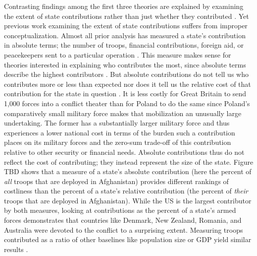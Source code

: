 \documentclass[12pt,letterpaper]{article}
\begin{document}
		Contrasting findings among the first three theories are explained by examining the extent of state contributions rather than just whether they contributed \citep[4]{cranmer_coalitionqualitymultinational_2017}. Yet previous work examining the extent of state contributions suffers from improper conceptualization. Almost all prior analysis has measured a state's contribution in absolute terms; the number of troops, financial contributions, foreign aid, or peacekeepers sent to a particular operation \citep{mello_democraticparticipationarmed_2014, haesebrouck_explainingmemberstates_2016}. This measure makes sense for theories interested in explaining who contributes the most, since absolute terms describe the highest contributors \citep[40-41]{bogers_missionafghanistanwho_2013}. But absolute contributions do not tell us who contributes more or less than expected nor does it tell us the relative cost of that contribution for the state in question \citep{kreps_eliteconsensusdeterminant_2010}. It is less costly for Great Britain to send 1,000 forces into a conflict theater than for Poland to do the same since Poland's comparatively small military force makes that mobilization an unusually large undertaking. The former has a substantially larger military force and thus experiences a lower national cost in terms of the burden such a contribution places on its military forces and the zero-sum trade-off of this contribution relative to other security or financial needs. Absolute contributions thus do not reflect the cost of contributing; they instead represent the size of the state. Figure TBD shows that a measure of a state's absolute contribution (here the percent of \emph{all} troops that are deployed in Afghanistan) provides different rankings of costliness than the percent of a state's relative contribution (the percent of \textit{their} troops that are deployed in Afghanistan). While the US is the largest contributor by both measures, looking at contributions as the percent of a state's armed forces demonstrates that countries like Denmark, New Zealand, Romania, and Australia were devoted to the conflict to a surprising extent. Measuring troops contributed as a ratio of other baselines like population size or GDP yield similar results \citep[41]{bogers_missionafghanistanwho_2013}.

\end{document}
